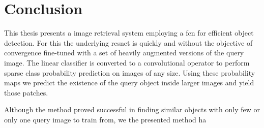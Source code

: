 %
\chapter{Conclusion}
\label{sec:conclusion}
This thesis presents a image retrieval system employing a \acrlong{fcn} for efficient object detection. For this the underlying \gls{resnet} is quickly and without the objective of convergence fine-tuned with a set of heavily augmented versions of the query image. The linear classifier is converted to a convolutional operator to perform sparse class probability prediction on images of any size. Using these probability maps we predict the existence of the query object inside larger images and yield those patches.

Although the method proved successful in finding similar objects with only few or only one query image to train from, we the presented method ha  
